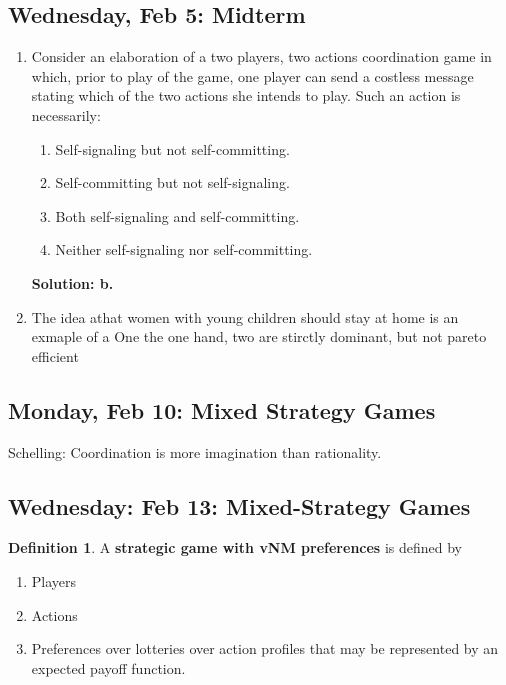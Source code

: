 \documentclass[10pt, oneside]{article}
\theoremstyle{definition}
\newtheorem{defn}{Definition}
\begin{document}
\newpage
\subsection*{Wednesday, Feb 5: Midterm}
\begin{enumerate}
    \item Consider an elaboration of a two players, two actions coordination game in which, prior to play of the game, one player can send a costless message stating which of the two actions she intends to play. Such an action is necessarily:
    \begin{enumerate}
        \item Self-signaling but not self-committing.
        \item Self-committing but not self-signaling.
        \item Both self-signaling and self-committing.
        \item Neither self-signaling nor self-committing.
    \end{enumerate}
    \textbf{Solution: b.}
    \item The idea athat women with young children should stay at home is an exmaple of a 
    One the one hand, two are stirctly dominant, but not pareto efficient
\end{enumerate}


\newpage
\subsection*{Monday, Feb 10: Mixed Strategy Games}
Schelling: Coordination is more imagination than rationality.





\newpage
\subsection*{Wednesday: Feb 13: Mixed-Strategy Games}
\begin{defn}
    A \textbf{strategic game with vNM preferences} is defined by 
    \begin{enumerate}
        \item Players
        \item Actions
        \item Preferences over lotteries over action profiles that may be represented by an expected payoff function.
    \end{enumerate}
    \end{defn}
\end{document}
